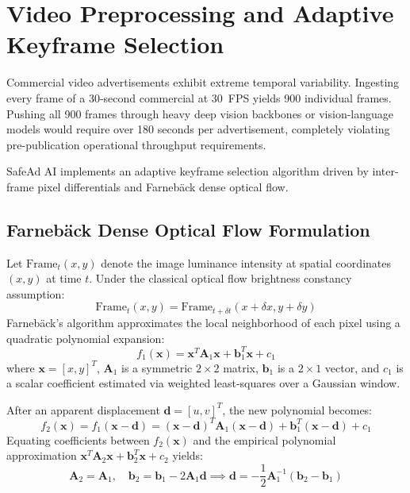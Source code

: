 \documentclass[12pt,a4paper]{report}
\begin{document}
\section{Video Preprocessing and Adaptive Keyframe Selection}

Commercial video advertisements exhibit extreme temporal variability. Ingesting every frame of a 30-second commercial at 30~FPS yields 900 individual frames. Pushing all 900 frames through heavy deep vision backbones or vision-language models would require over 180 seconds per advertisement, completely violating pre-publication operational throughput requirements.

SafeAd AI implements an adaptive keyframe selection algorithm driven by inter-frame pixel differentials and Farneb\"{a}ck dense optical flow.

\subsection{Farneb\"{a}ck Dense Optical Flow Formulation}
Let $\text{Frame}_t(x, y)$ denote the image luminance intensity at spatial coordinates $(x, y)$ at time $t$. Under the classical optical flow brightness constancy assumption:
\begin{equation}
\text{Frame}_t(x, y) = \text{Frame}_{t+\delta t}(x + \delta x, y + \delta y)
\end{equation}
Farneb\"{a}ck's algorithm approximates the local neighborhood of each pixel using a quadratic polynomial expansion:
\begin{equation}
f_1(\mathbf{x}) = \mathbf{x}^T \mathbf{A}_1 \mathbf{x} + \mathbf{b}_1^T \mathbf{x} + c_1
\end{equation}
where $\mathbf{x} = [x, y]^T$, $\mathbf{A}_1$ is a symmetric $2 \times 2$ matrix, $\mathbf{b}_1$ is a $2 \times 1$ vector, and $c_1$ is a scalar coefficient estimated via weighted least-squares over a Gaussian window.

After an apparent displacement $\mathbf{d} = [u, v]^T$, the new polynomial becomes:
\begin{equation}
f_2(\mathbf{x}) = f_1(\mathbf{x} - \mathbf{d}) = (\mathbf{x} - \mathbf{d})^T \mathbf{A}_1 (\mathbf{x} - \mathbf{d}) + \mathbf{b}_1^T (\mathbf{x} - \mathbf{d}) + c_1
\end{equation}
Equating coefficients between $f_2(\mathbf{x})$ and the empirical polynomial approximation $\mathbf{x}^T \mathbf{A}_2 \mathbf{x} + \mathbf{b}_2^T \mathbf{x} + c_2$ yields:
\begin{equation}
\mathbf{A}_2 = \mathbf{A}_1, \quad \mathbf{b}_2 = \mathbf{b}_1 - 2 \mathbf{A}_1 \mathbf{d} \implies \mathbf{d} = -\frac{1}{2} \mathbf{A}_1^{-1} (\mathbf{b}_2 - \mathbf{b}_1)
\end{equation}
\end{document}

